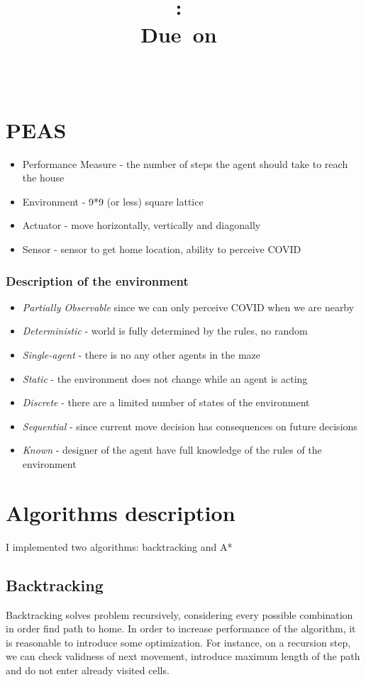 \documentclass{article}
\title{
    \vspace{2in}
    \textmd{\textbf{\hmwkClass:\ \hmwkTitle}}\\
    \normalsize\vspace{0.1in}\small{Due\ on\ \hmwkDueDate}\\
    \vspace{0.1in}\large{\textit{\hmwkClassInstructor\ \hmwkClassTime}}
    \vspace{3in}\\\text{BS19-02}
}
\author{\hmwkAuthorName}
\date{}
\newcommand{\C}{COVID }
\begin{document}
\maketitle

\pagebreak
\section{PEAS}
\begin{itemize}
    \item Performance Measure - the number of steps the agent should take to reach the house
    \item Environment - 9*9 (or less) square lattice
    \item Actuator - move horizontally, vertically and diagonally
    \item Sensor - sensor to get home location, ability to perceive \C
\end{itemize}
\subsubsection{Description of the environment}
\begin{itemize}
    \item \textit{Partially Observable} since we can only perceive \C when we are nearby
    \item \textit{Deterministic} - world is fully determined by the rules, no random
    \item \textit{Single-agent} - there is no any other agents in the maze
    \item \textit{Static} - the environment does not change while an agent is acting
    \item \textit{Discrete} - there are a limited number of states of the environment
    \item \textit{Sequential} - since current move decision has consequences on future decisions
    \item \textit{Known} - designer of the agent have full knowledge of the rules of the environment
\end{itemize}

\newpage
\section{Algorithms description}
I implemented two algorithms: backtracking and A*
\subsection{Backtracking}
Backtracking solves problem recursively, considering every possible combination in order find path to home.
In order to increase performance of the algorithm, it is reasonable to introduce some optimization. For instance, on a recursion step, we can check validness of next movement, introduce maximum length of the path and do not enter already visited cells. 
\end{document}
